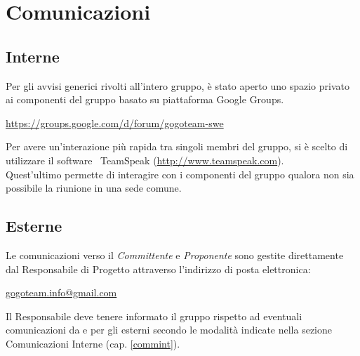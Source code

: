 \section{Comunicazioni}{


	\subsection{Interne}{
	\label{commint}
	Per gli avvisi generici rivolti all'intero gruppo, è stato aperto uno spazio privato ai componenti del gruppo basato su piattaforma  Google Groups.
	\begin{center}
	\url{https://groups.google.com/d/forum/gogoteam-swe}
	\end{center} 
	
	Per avere un'interazione più rapida tra singoli membri del gruppo, si è scelto di utilizzare il software\g~ TeamSpeak (\url{http://www.teamspeak.com}).\\ 
	Quest'ultimo permette di interagire con i componenti del gruppo qualora non sia possibile la riunione in una sede comune.
	}
	
	\subsection{Esterne}{
	Le comunicazioni verso il \textit{Committente} e \textit{Proponente} sono gestite direttamente dal Responsabile di Progetto attraverso l'indirizzo di posta elettronica:\\
	\begin{center}
	\href{gogoteam.info@gmail.com}{gogoteam.info@gmail.com}
	\end{center}
	}
	Il Responsabile deve tenere informato il gruppo rispetto ad eventuali comunicazioni da e per gli esterni secondo le modalità indicate nella sezione Comunicazioni Interne (cap. \ref{commint}). 
}